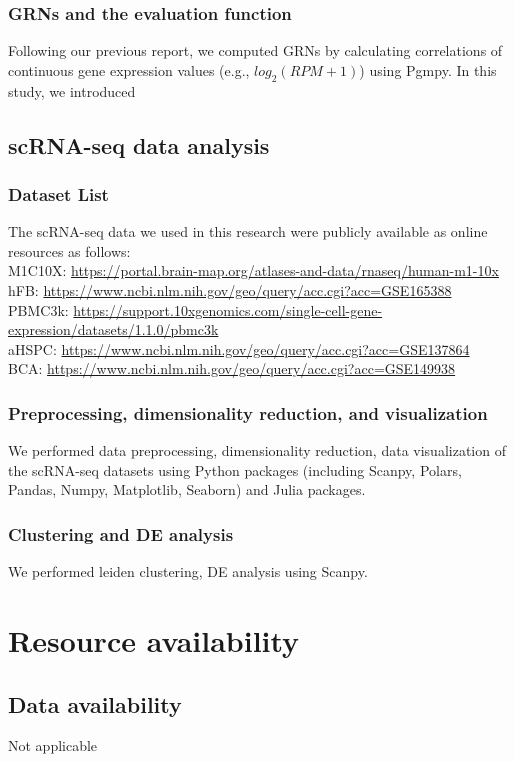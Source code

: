 \documentclass{article}
\begin{document}
\subsubsection*{GRNs and the evaluation function}
Following our previous report\cite{okano2023set}, we computed GRNs by calculating
correlations of continuous gene expression values (e.g., $log_2(RPM+1)$) using Pgmpy\cite{pgmpy}. In this study, we introduced

\subsection*{scRNA-seq data analysis}
\subsubsection*{Dataset List}
The scRNA-seq data we used in this research were publicly available as online
resources as follows:\\
M1C10X: \url{https://portal.brain-map.org/atlases-and-data/rnaseq/human-m1-10x}\\
hFB: \url{https://www.ncbi.nlm.nih.gov/geo/query/acc.cgi?acc=GSE165388}\\
PBMC3k: \url{https://support.10xgenomics.com/single-cell-gene-expression/datasets/1.1.0/pbmc3k}\\
aHSPC: \url{https://www.ncbi.nlm.nih.gov/geo/query/acc.cgi?acc=GSE137864}\\
BCA: \url{https://www.ncbi.nlm.nih.gov/geo/query/acc.cgi?acc=GSE149938}\\
\subsubsection*{Preprocessing, dimensionality reduction, and visualization}
We performed data preprocessing, dimensionality reduction, data visualization
of the scRNA-seq datasets using Python packages (including Scanpy\cite{scanpy}, Polars,
Pandas\cite{pandas}, Numpy, Matplotlib\cite{matplotlib}, Seaborn\cite{seaborn}) and Julia packages.
\subsubsection*{Clustering and DE analysis}
We performed leiden clustering, DE analysis using Scanpy.

\section*{Resource availability}
\subsection*{Data availability}
Not applicable
\end{document}
